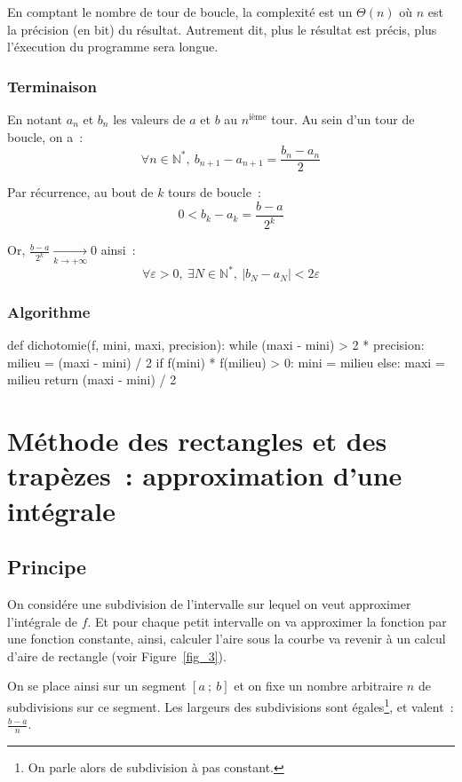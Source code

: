 		En comptant le nombre de tour de boucle, la complexité est un $\Theta (n)$ où $n$ est la précision (en bit) du résultat. Autrement dit, plus le résultat est précis, plus l'éxecution du programme sera longue.
		
		\subsubsection{Terminaison}
		
		En notant $a_n$ et $b_n$ les valeurs de $a$ et $b$ au $n^{\textrm{ième}}$ tour. Au sein d'un tour de boucle, on a~:
		\[
			\forall n \in \mathbb{N}^*,\ b_{n+1} - a_{n+1} = \frac{b_n - a_n}{2}
		\]
		
		Par récurrence, au bout de $k$ tours de boucle~:
		\[
			0 < b_k - a_k = \frac{b - a}{2^k}
		\]
		
		Or, $\frac{b - a}{2^k} \underset{k \to +\infty}{\longrightarrow} 0$ ainsi~:
		\[
			\forall \varepsilon > 0,\ \exists N \in \mathbb{N}^*,\ |b_N - a_N| < 2 \varepsilon
		\]
		
		\subsubsection{Algorithme}
			
		\begin{pythoncode}
			def dichotomie(f, mini, maxi, precision):
				while (maxi - mini) > 2 * precision:
					milieu = (maxi - mini) / 2
					if f(mini) * f(milieu) > 0:
						mini = milieu
					else:
						maxi = milieu
				return (maxi - mini) / 2
		\end{pythoncode}

\section{Méthode des rectangles et des trapèzes~: approximation d'une intégrale}
	
	\subsection{Principe}
		
		On considére une subdivision de l'intervalle sur lequel on veut approximer l'intégrale de $f$. Et pour chaque petit intervalle on va approximer la fonction par une fonction constante, ainsi, calculer l'aire sous la courbe va revenir à un calcul d'aire de rectangle (voir Figure~\ref{fig_3}).
		
		 On se place ainsi sur un segment $[a~;\ b]$ et on fixe un nombre arbitraire $n$ de subdivisions sur ce segment. Les largeurs des subdivisions sont égales\footnote{On parle alors de subdivision à pas constant.}, et valent~: $\frac{b - a}{n}$.
		 
